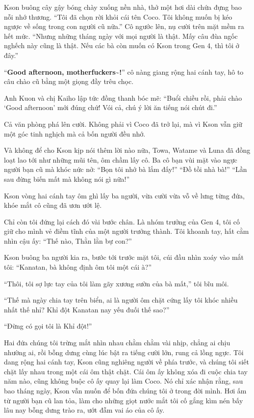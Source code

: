 \documentclass[../main.tex]{subfiles}
\begin{document}
Kson buông cây gậy bóng chày xuống nền nhà, thở một hơi dài chứa đựng bao nỗi nhớ thương. ``Tôi đã chọn rời khỏi cái tên Coco. Tôi không muốn bị kéo ngược về sống trong con người cũ nữa.'' Cô ngước lên, nụ cười trên mặt mềm ra hết mức. ``Nhưng những tháng ngày với mọi người là thật. Mấy câu đùa ngốc nghếch này cũng là thật. Nếu các bà còn muốn có Kson trong Gen 4, thì tôi ở đây.''

``\textbf{Good afternoon, motherfuckers\~{}!}'' cô nàng giang rộng hai cánh tay, hô to câu chào cũ bằng một giọng đầy trêu chọc.

Anh Kuon và chị Kaiho lập tức đồng thanh bóc mẽ: ``Buổi chiều rồi, phải chào `Good afternoon' mới đúng chứ! Vói cả, chú ý lời ăn tiếng nói chút đi.''

Cả văn phòng phá lên cười. Không phải vì Coco đã trở lại, mà vì Kson vẫn giữ một góc tinh nghịch mà cả bốn người đều nhớ.

Và không để cho Kson kịp nói thêm lời nào nữa, Towa, Watame và Luna đã đồng loạt lao tới như những mũi tên, ôm chầm lấy cô. Ba cô bạn vùi mặt vào ngực người bạn cũ mà khóc nức nở: ``Bọn tôi nhớ bà lắm đấy!'' ``Đồ tồi nhà bà!'' ``Lần sau đừng biến mất mà không nói gì nữa!''

Kson vòng hai cánh tay ôm ghì lấy ba người, vừa cười vừa vỗ về lưng từng đứa, khóe mắt cô cũng đã ươn ướt lệ.

Chỉ còn tôi đứng lại cách đó vài bước chân. Là nhóm trưởng của Gen 4, tôi cố giữ cho mình vẻ điềm tĩnh của một người trưởng thành. Tôi khoanh tay, hất cằm nhìn cậu ấy: ``Thế nào, Thằn lằn bự con?''

Kson buông ba người kia ra, bước tới trước mặt tôi, cúi đầu nhìn xoáy vào mắt tôi: ``Kanatan, bà không định ôm tôi một cái à?''

``Thôi, tôi sợ lực tay của tôi làm gãy xương sườn của bà mất,'' tôi bĩu môi.

``Thế mà ngày chia tay trên biển, ai là người ôm chặt cứng lấy tôi khóc nhiều nhất thế nhỉ? Khỉ đột Kanatan nay yếu đuối thế sao?''

``Đừng có gọi tôi là Khỉ đột!''

Hai đứa chúng tôi trừng mắt nhìn nhau chằm chằm vài nhịp, chẳng ai chịu nhường ai, rồi bỗng dưng cùng lúc bật ra tiếng cười lớn, rung cả lồng ngực. Tôi dang rộng hai cánh tay, Kson cũng nghiêng người về phía trước, và chúng tôi siết chặt lấy nhau trong một cái ôm thật chặt. Cái ôm ấy không xóa đi cuộc chia tay năm nào, cũng không buộc cô ấy quay lại làm Coco. Nó chỉ xác nhận rằng, sau bao tháng ngày, Kson vẫn muốn để bốn đứa chúng tôi ở trong đời mình. Hơi ấm từ người bạn cũ lan tỏa, làm cho những giọt nước mắt tôi cố gắng kìm nén bấy lâu nay bỗng dưng trào ra, ướt đẫm vai áo của cô ấy.
\end{document}
